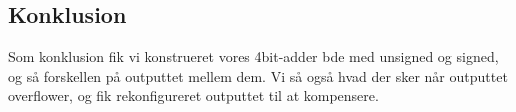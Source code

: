 \documentclass[../journal2.tex]{subfiles}
\begin{document}
\subsection{Konklusion}
Som konklusion fik vi konstrueret vores 4bit-adder bde med unsigned og signed, og så forskellen på outputtet mellem dem. Vi så også hvad der sker når outputtet overflower, og fik rekonfigureret outputtet til at kompensere.





\end{document}
